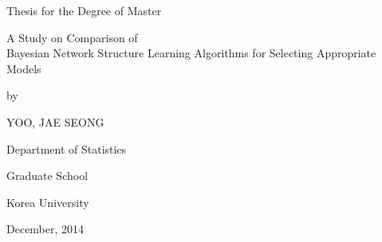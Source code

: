 \documentclass[12pt,a4paper,oneside]{book}
\theoremstyle{plain}
\theoremstyle{definition}
\theoremstyle{remark}
\theoremstyle{definition}
\numberwithin{equation}{chapter}
\begin{document}





 \linespread{1.0}
 \thispagestyle{empty}
 \begin{center}
 {\Large Thesis for the Degree of Master}
 \end{center}
 \vspace{20mm}
 \begin{center}
 \LARGE A Study on Comparison of\\ Bayesian Network Structure Learning Algorithms for Selecting Appropriate Models
 \end{center}
 \vspace{20mm} 
  \begin{center}
 {\Large by}
 \end{center}
 \begin{center}
 {\Large YOO, JAE SEONG}
 \end{center}
 \vspace{40mm}
 \begin{center}
 {\Large Department of Statistics}
 \end{center}
 \begin{center}
 {\Large Graduate School}
 \end{center}
 \begin{center}
 {\Large Korea University}
 \end{center}
  \vspace{5mm}
 \begin{center}
 {\Large December, 2014}
 \end{center}
 \linespread{1.6}
\end{document}
